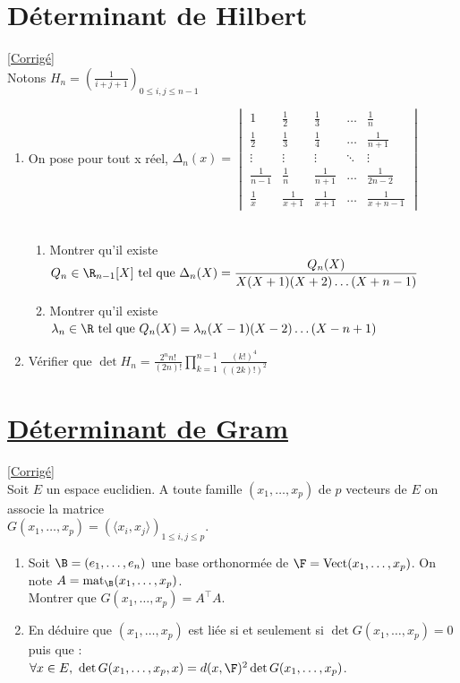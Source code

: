 \documentclass[8pt]{book}
\begin{document}
	\section{Déterminant de Hilbert}
	\label{Déterminant de Hilbert}
	\textcolor{blue}{\hyperref[Déterminant de Hilbert corrigé]{[Corrigé]}}\\
	Notons $H_n=\displaystyle\left(\frac{1}{i+j+1}\right)_{0\leq i,j\leq n-1}$\\
	\begin{enumerate}[leftmargin=*]
		\item On pose pour tout x réel, $\Delta_n(x)=
		\begin{vmatrix}
			1            &\frac{1}{2}  &\frac{1}{3}  &\dots &\frac{1}{n}\\
			\frac{1}{2}  &\frac{1}{3}  &\frac{1}{4}  &\dots &\frac{1}{n+1}\\
			\vdots       &\vdots       &\vdots       &\ddots&\vdots\\
			\frac{1}{n-1}&\frac{1}{n}  &\frac{1}{n+1}&\dots &\frac{1}{2n-2}\\
			\frac{1}{x}  &\frac{1}{x+1}&\frac{1}{x+1}&\dots &\frac{1}{x+n-1}
		\end{vmatrix}$\\\\
		\begin{enumerate}[label=\alph*.]
			\item Montrer qu'il existe $Q_n\in \R_{n-1}[X]\text{ tel que } \Delta_n(X)=\displaystyle\frac{Q_n(X)}{X(X+1)(X+2)\dots(X+n-1)}$
			\item Montrer qu'il existe $\lambda_n\in \R\text{ tel que } Q_n(X)=\lambda_n(X-1)(X-2)\dots(X-n+1)$
		\end{enumerate}
		\item Vérifier que $\det{H_n}=\displaystyle\frac{2^nn!}{(2n)!}\prod\limits_{k=1}^{n-1}{\frac{(k!)^4}{((2k)!)^2}}$
	\end{enumerate}
	
	\section{\underline{Déterminant de Gram}}
	\label{Déterminant de Gram}
	\textcolor{blue}{\hyperref[Déterminant de Gram corrigé]{[Corrigé]}}\\
	Soit $E$ un espace euclidien. A toute famille $(x_1,\dots,x_p)$ de $p$ vecteurs de $E$ on associe la matrice\\
	$G(x_1,\dots,x_p)=(\langle x_i,x_j\rangle)_{1\leq i,j\leq p}$.
	\begin{enumerate}[leftmargin=*]
		\item Soit $\B=(e_1,\dots,e_n)$ une base orthonormée de $\F=\text{Vect}(x_1,\dots,x_p)$. On note $A=\text{mat}_{\B}(x_1,\dots,x_p)$.\\
		Montrer que $G(x_1,\dots,x_p)=A^\top A$.
		\item En déduire que $(x_1,\dots,x_p)$ est liée si et seulement si $\det{G(x_1,\dots,x_p)}=0$ puis que :\\
		$\forall x\in E,\ \det{G(x_1,\dots,x_p,x)}=d(x,\F)^2\det{G(x_1,\dots,x_p)}$.
	\end{enumerate}
	
\end{document}
